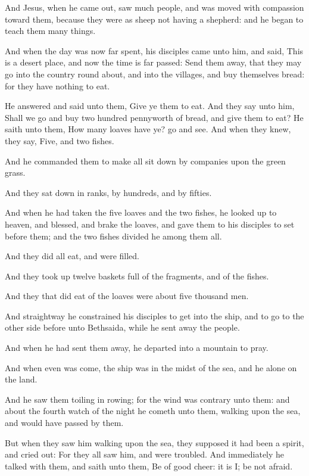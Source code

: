 \verse And Jesus, when he came out, saw much people, and was moved with compassion toward them, because they were as sheep not having a shepherd: and he began to teach them many things.

\verse And when the day was now far spent, his disciples came unto him, and said, This is a desert place, and now the time is far passed: \verse Send them away, that they may go into the country round about, and into the villages, and buy themselves bread: for they have nothing to eat.

\verse He answered and said unto them, Give ye them to eat. And they say unto him, Shall we go and buy two hundred pennyworth of bread, and give them to eat?  \verse He saith unto them, How many loaves have ye?  go and see. And when they knew, they say, Five, and two fishes.

\verse And he commanded them to make all sit down by companies upon the green grass.

\verse And they sat down in ranks, by hundreds, and by fifties.

\verse And when he had taken the five loaves and the two fishes, he looked up to heaven, and blessed, and brake the loaves, and gave them to his disciples to set before them; and the two fishes divided he among them all.

\verse And they did all eat, and were filled.

\verse And they took up twelve baskets full of the fragments, and of the fishes.

\verse And they that did eat of the loaves were about five thousand men.

\verse And straightway he constrained his disciples to get into the ship, and to go to the other side before unto Bethsaida, while he sent away the people.

\verse And when he had sent them away, he departed into a mountain to pray.

\verse And when even was come, the ship was in the midst of the sea, and he alone on the land.

\verse And he saw them toiling in rowing; for the wind was contrary unto them: and about the fourth watch of the night he cometh unto them, walking upon the sea, and would have passed by them.

\verse But when they saw him walking upon the sea, they supposed it had been a spirit, and cried out: \verse For they all saw him, and were troubled. And immediately he talked with them, and saith unto them, Be of good cheer: it is I; be not afraid.

